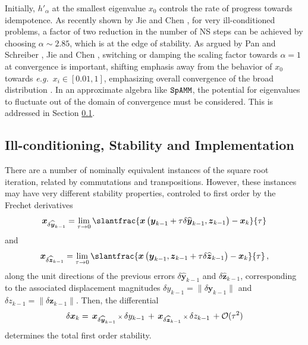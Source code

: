 \documentclass[letterpaper,twocolumn,amsmath,amsfont,amssymb,english,aps,jcp,preprintnumbers,groupaddress,nofootinbib,tightenlines,floatfix]{revtex4}
\newcommand{\mat}[1]{\boldsymbol{#1}}
\theoremstyle{plain}
\theoremstyle{remark}
\theoremstyle{plain}
\begin{document}
Initially, $h'_\alpha$ at the smallest eigenvalue $x_0$ controls the
rate of progress towards idempotence.  As recently shown by Jie and
Chen \cite{Chen2014}, for very ill-conditioned problems, a factor of
two reduction in the number of NS steps can be achieved by choosing
$\alpha \sim 2.85$, which is at the edge of stability.  As argued by
Pan and Schreiber \cite{Pan1991}, Jie and Chen \cite{Chen2014},
switching or damping the scaling factor towards $\alpha=1$ at
convergence is important, shifting emphasis away from the behavior of
$x_0$ towards {\em e.g.}~$x_i \in [0.01,1]$, emphasizing overall
convergence of the broad distribution \cite{Pan and Scriber}.  In an
approximate algebra like $\tt SpAMM$, the potential for eigenvalues to
fluctuate out of the domain of convergence must be considered.  This
is addressed in Section \ref{}.

\subsection{Ill-conditioning, Stability and Implementation}

There are a number of nominally equivalent instances of the square root iteration, related by commutations and transpositions. 
However, these instances may have very different stability properties,  controled to first order by the Frechet derivatives
\begin{equation}
  \mat{x}_{\delta \widehat{ \mat{y}}_{k-1}}
= \lim_{\tau \rightarrow 0} \slantfrac{ \mat{x} \left( \mat{y}_{k-1} + \tau \delta \widehat{\mat{y}}_{k-1} ,  {\mat{z}}_{k-1}  \right)
                                     -\mat{x}_k    }{\tau} 
 \end{equation}
and
 \begin{equation}
 \mat{x}_{\delta \widehat{ \mat{z}}_{k-1}} = \lim_{\tau \rightarrow 0}
\slantfrac{ \mat{x} \left( {\mat{y}}_{k-1} , \mat{z}_{k-1} +\tau  \delta \widehat{\mat{z}}_{k-1} \right) - \mat{x}_k   }{\tau}  \, , 
 \end{equation}
along the unit directions of the previous errors $\delta \widehat{\mat{y}}_{k-1}$ and $\delta \widehat{\mat{z}}_{k-1}$, corresponding 
to the associated displacement magnitudes $\delta y_{k-1} = \lVert \delta \mat{y}_{k-1} \rVert$  and  $\delta z_{k-1}=\lVert \delta \mat{z}_{k-1} \rVert$.
Then, the differential 
\begin{equation} \label{firstorderdual}
\delta \mat{x}_k = \,  { \mat{x}}_{\delta \widehat{\mat{y}}_{k-1}}  \, {\scriptstyle \times} \, \delta y_{k-1}
                 \, + \,  { \mat{x}}_{\delta \widehat{\mat{z}}_{k-1}}  \, {\scriptstyle \times} \, \delta z_{k-1}  \, + {\cal O}(\tau^2) 
\end{equation}
determines the total first order stability. 
\end{document}
